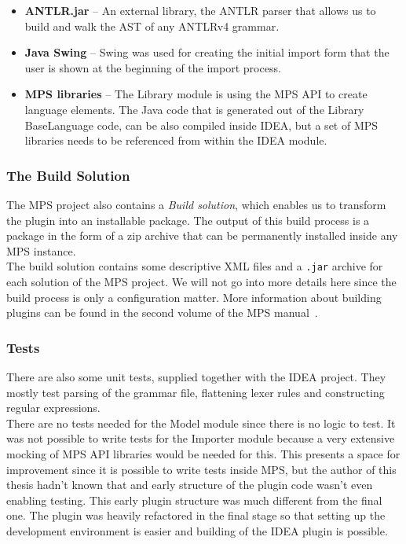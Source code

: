 \begin{itemize}
	\item \textbf{ANTLR.jar} -- An external library, the ANTLR parser that allows us to build and walk the AST of any ANTLRv4 grammar.

	\item \textbf{Java Swing} -- Swing was used for creating the initial import form that the user is shown at the beginning of the import process.

	\item \textbf{MPS libraries} -- The Library module is using the MPS API to create language elements. The Java code that is generated out of the Library BaseLanguage code, can be also compiled inside IDEA, but a set of MPS libraries needs to be referenced from within the IDEA module.
\end{itemize}

\subsubsection{The Build Solution}
\label{chap:the_build_solution}

The MPS project also contains a \textit{Build solution}, which enables us to transform the plugin into an installable package.
The output of this build process is a package in the form of a zip archive that can be permanently installed inside any MPS instance.
\\

The build solution contains some descriptive XML files and a \texttt{.jar} archive for each solution of the MPS project.
We will not go into more details here since the build process is only a configuration matter.
More information about building plugins can be found in the second volume of the MPS manual~\cite{MPS2}.

\subsubsection{Tests}

There are also some unit tests, supplied together with the IDEA project.
They mostly test parsing of the grammar file, flattening lexer rules and constructing regular expressions.
\\

There are no tests needed for the Model module since there is no logic to test.
It was not possible to write tests for the Importer module because a very extensive mocking of MPS API libraries would be needed for this.
This presents a space for improvement since it is possible to write tests inside MPS, but the author of this thesis hadn't known that and early structure of the plugin code wasn't even enabling testing.
This early plugin structure was much different from the final one.
The plugin was heavily refactored in the final stage so that setting up the development environment is easier and building of the IDEA plugin is possible.

